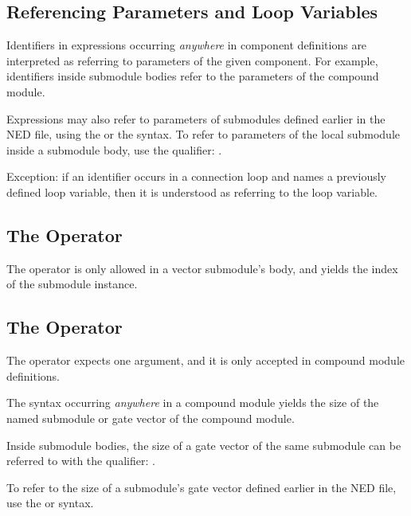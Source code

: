 \subsection{Referencing Parameters and Loop Variables}
\label{sec:ned-ref:referencing-parameters-and-loop-variables}

Identifiers in expressions occurring \textit{anywhere} in component definitions
are interpreted as referring to parameters of the given component. For example,
identifiers inside submodule bodies refer to the parameters of the compound
module.

Expressions may also refer to parameters of submodules defined earlier
in the NED file, using the  or the
 syntax. To refer to parameters
of the local submodule inside a submodule body, use the
 qualifier: .

Exception: if an identifier occurs in a connection  loop and names
a previously defined loop variable, then it is understood as referring to
the loop variable.


\subsection{The  Operator}
\label{sec:ned-ref:index-operator}

The  operator is only allowed in a vector submodule's body,
and yields the index of the submodule instance.


\subsection{The  Operator}
\label{sec:ned-ref:sizeof-operator}

The  operator expects one argument, and it is only accepted
in compound module definitions.

The  syntax occurring \textit{anywhere} in a compound
module yields the size of the named submodule or gate vector of the
compound module.

Inside submodule bodies, the size of a gate vector of the same submodule
can be referred to with the  qualifier: .

To refer to the size of a submodule's gate vector defined earlier in the
NED file, use the  or
 syntax.


